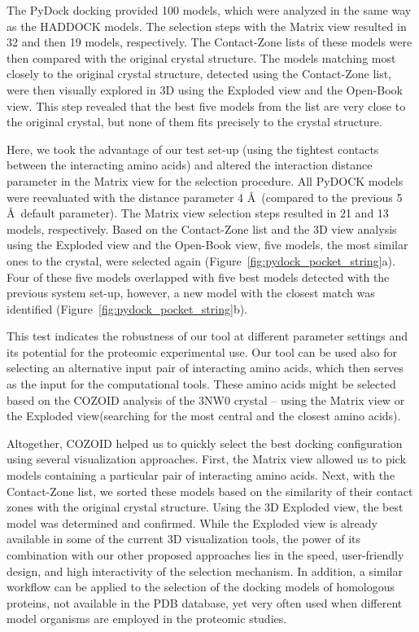 \documentclass{bmcart}
\def\OpBook {Open-Book view\xspace}
\def\ExpView {Exploded view\xspace}
\def\MatView {Matrix view\xspace}
\def\CoZoList{Contact-Zone list\xspace}
\def\CoZoLists{Contact-Zone lists\xspace}
\begin{document}
The PyDock docking provided 100 models, which were analyzed in the same way as the HADDOCK models. 
The selection steps with the \MatView resulted in 32 and then 19 models, respectively. 
The \CoZoLists of these models were then compared with the original crystal structure.
The models matching most closely to the original crystal structure, detected using the \CoZoList, were then visually explored in 3D using the \ExpView and the \OpBook.
This step revealed that the best five models from the list are very close to the original crystal, but none of them fits precisely to the crystal structure.

Here, we took the advantage of our test set-up (using the tightest contacts between the interacting amino acids) and altered the interaction distance parameter in the \MatView for the selection procedure. 
All PyDOCK models were reevaluated with the distance parameter 4 \AA~(compared to the previous 5 \AA~default parameter). 
The \MatView selection steps resulted in 21 and 13 models, respectively. 
Based on the \CoZoList and the 3D view analysis using the \ExpView and the \OpBook, five models, the most similar ones to the crystal, were selected again (Figure~\ref{fig:pydock_pocket_string}a). 
Four of these five models overlapped with five best models detected with the previous system set-up, however, a new model with the closest match was identified (Figure~\ref{fig:pydock_pocket_string}b).

This test indicates the robustness of our tool at different parameter settings and its potential for the proteomic experimental use.
Our tool can be used also for selecting an alternative input pair of interacting amino acids, which then serves as the input for the computational tools.
These amino acids might be selected based on the COZOID analysis of the 3NW0 crystal -- using the \MatView or the \ExpView (searching for the most central and the closest amino acids).

Altogether, COZOID helped us to quickly select the best docking configuration using several visualization approaches. 
First, the \MatView allowed us to pick models containing a particular pair of interacting amino acids. 
Next, with the \CoZoList, we sorted these models based on the similarity of their contact zones with the original crystal structure. 
Using the 3D \ExpView, the best model was determined and confirmed. 
While the Exploded view is already available in some of the current 3D visualization tools, the power of its combination with our other proposed approaches lies in the speed, user-friendly design, and high interactivity of the selection mechanism. 
In addition, a similar workflow can be applied to the selection of the docking models of homologous proteins, not available in the PDB database, yet very often used when different model organisms are employed in the proteomic studies.
 
\end{document}

